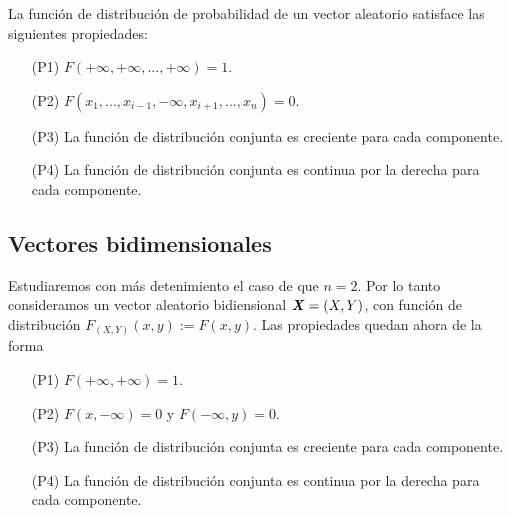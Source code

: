 \begin{teo}
    La función de distribución de probabilidad de un vector aleatorio satisface las siguientes propiedades:
    \begin{enumerate}
        \item[(P1)] $F(+\infty,+\infty,...,+\infty) = 1$.
        \item[(P2)] $F(x_1,...,x_{i-1},-\infty,x_{i+1},...,x_n) = 0$.
        \item[(P3)] La función de distribución conjunta es creciente para cada componente.
        \item[(P4)] La función de distribución conjunta es continua por la derecha para cada componente.
    \end{enumerate}
\end{teo}

\subsection{Vectores bidimensionales}

Estudiaremos con más detenimiento el caso de que $n = 2$. Por lo tanto consideramos un vector aleatorio bidiensional $\textbf{\textit{X}} = (X,Y)$, con función de distribución $F_{(X,Y)}(x,y) := F(x,y)$. Las propiedades quedan ahora de la forma
\begin{teo}
    \begin{enumerate}
        \item[(P1)] $F(+\infty,+\infty) = 1$.
        \item[(P2)] $F(x,-\infty) = 0$ y $F(-\infty,y) = 0$.
        \item[(P3)] La función de distribución conjunta es creciente para cada componente.
        \item[(P4)] La función de distribución conjunta es continua por la derecha para cada componente.
    \end{enumerate}
\end{teo}

